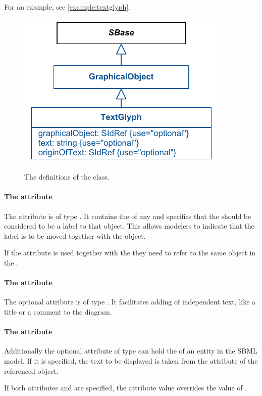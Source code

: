 For an example, see \ref{example:textglyph}.

\begin{figure}[!ht]
\includegraphics{uml/layout-textglyph-uml}\\
\caption{The definitions of the \TextGlyph class.}
\label{uml:textglyph}
\end{figure}

\paragraph{The  attribute}
The attribute  is of type . It 
contains the  of any \GraphicalObject and specifies that the 
\TextGlyph should be considered to be a label to that object. This 
allows modelers to indicate that the label is to be moved together with the 
object. 

If the  attribute is used together with the  
they need to refer to the same object in the \LayoutClass.

\paragraph{The  attribute}
The optional  attribute is of type . It 
facilitates adding of independent text, like a title or a comment to the 
diagram. 

\paragraph{The  attribute}
Additionally the optional attribute  of type 
 can hold the  of an entity in the SBML 
model. If it is specified, the text to be displayed is taken from the 
 attribute of the referenced object. 

If both attributes  and  are specified, 
the  attribute value overrides the value of . 


